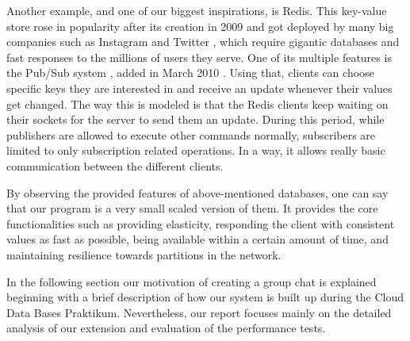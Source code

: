 Another example, and one of our biggest inspirations, is Redis. This key-value store rose in popularity after its creation in 2009 and got deployed by many big companies such as Instagram \cite{krieger2011instagram} and Twitter \cite{yu2014twitter}, which require gigantic databases and fast responses to the millions of users they serve. One of its multiple features is the Pub/Sub system \cite{redis2020pubsub}, added in March 2010 \cite{sanfilippo2010pubsub}. Using that, clients can choose specific keys they are interested in and receive an update whenever their values get changed. The way this is modeled is that the Redis clients keep waiting on their sockets for the server to send them an update. During this period, while publishers are allowed to execute other commands normally, subscribers are limited to only subscription related operations. In a way, it allows really basic communication between the different clients.


By observing the provided features of above-mentioned databases, one can say that our program is a very small scaled version of them. It provides the core functionalities such as providing elasticity, responding the client with consistent values as fast as possible, being available within a certain amount of time, and maintaining resilience towards partitions in the network.
 
In the following section our motivation of creating a group chat is explained beginning with a brief description of how our system is built up during the Cloud Data Bases Praktikum. Nevertheless, our report focuses mainly on the detailed analysis of our extension and evaluation of the performance tests.
